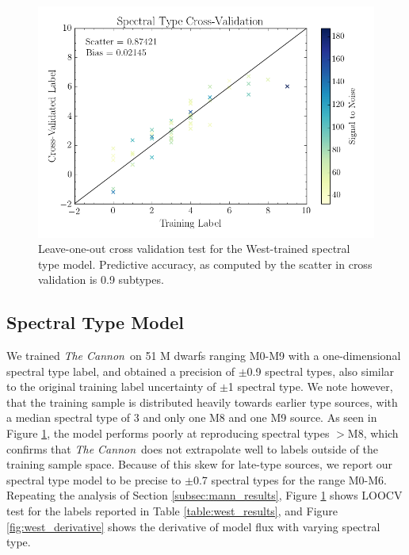 \documentclass[twocolumn]{aastex62}
\newcommand{\thecannon}{\textsl{The Cannon}}
\begin{document}
\begin{figure}
	\begin{center}
	\includegraphics[width=\linewidth]{crv_test_spt.png}
	\end{center}
	\caption{Leave-one-out cross validation test for the West-trained spectral type model. Predictive accuracy, as computed by the scatter in cross validation is 0.9 subtypes.}
	\label{fig:west_validation}
\end{figure}

\subsection{Spectral Type Model \label{subsec:west_results}}

We trained \thecannon\ on 51 M dwarfs ranging M0-M9 with a one-dimensional spectral type label, and obtained a precision of $\pm$0.9 spectral types, also similar to the original training label uncertainty of $\pm$1 spectral type. We note however, that the training sample is distributed heavily towards earlier type sources, with a median spectral type of 3 and only one M8 and one M9 source. As seen in Figure \ref{fig:west_validation}, the model performs poorly at reproducing spectral types $>$M8, which confirms that \thecannon\ does not extrapolate well to labels outside of the training sample space. Because of this skew for late-type sources, we report our spectral type model to be precise to $\pm$0.7 spectral types for the range M0-M6. Repeating the analysis of Section \ref{subsec:mann_results}, Figure \ref{fig:west_validation} shows LOOCV test for the labels reported in Table \ref{table:west_results}, and Figure \ref{fig:west_derivative} shows the derivative of model flux with varying spectral type.
\end{document}
